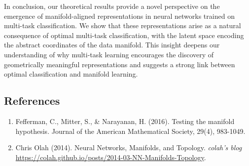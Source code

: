 \documentclass[12pt]{article}
\begin{document}
In conclusion, our theoretical results provide a novel perspective on the emergence of manifold-aligned representations in neural networks trained on multi-task classification. 
We show that these representations arise as a natural consequence of optimal multi-task classification, with the latent space encoding the abstract coordinates of the data manifold. 
This insight deepens our understanding of why multi-task learning encourages the discovery of geometrically meaningful representations and suggests a strong link between optimal classification and manifold learning. \\

\subsection{References}
\begin{enumerate}
	\item Fefferman, C., Mitter, S., \& Narayanan, H. (2016). Testing the manifold hypothesis. Journal of the American Mathematical Society, 29(4), 983-1049.\\
	\item Chris Olah (2014). Neural Networks, Manifolds, and Topology. \textit{colah's blog} \href{https://colah.github.io/posts/2014-03-NN-Manifolds-Topology}{https://colah.github.io/posts/2014-03-NN-Manifolds-Topology}.
\end{enumerate}
\end{document}
